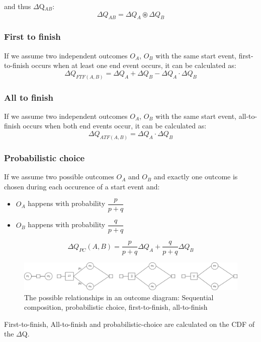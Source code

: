             and thus $\Delta$Q$_{AB}$:
        \begin{equation}
            \Delta Q_{AB} = \Delta Q_A \circledast \Delta Q_B
            \label{eq:}
        \end{equation}
        
    \subsubsection{First to finish}
            If we assume two independent outcomes $O_A$, $O_B$ with the same start event, first-to-finish occurs when at least one end event occurs, it can be calculated as:
        \begin{equation}
            \Delta Q_{FTF(A, B)} = \Delta Q_A + \Delta Q_B - \Delta Q_A \cdot \Delta Q_B  
            \label{eq:ftf}
        \end{equation}
            
    \subsubsection{All to finish}
        If we assume two independent outcomes $O_A$, $O_B$ with the same start event, all-to-finish occurs when both end events occur, it can be calculated as:
        \begin{equation}
            \Delta Q_{ATF(A, B)} = \Delta Q_A \cdot \Delta Q_B 
            \label{eq:atf}
        \end{equation}
        \subsubsection{Probabilistic choice}
        If we assume two possible outcomes $O_A$ and $O_B$ and exactly one outcome is chosen during each occurence of a start event and:
        \begin{itemize}
            \item $O_A$ happens with probability $\dfrac{p}{p+q}$
            \item $O_B$ happens with probability $\dfrac{q}{p + q}$
        \end{itemize}
        \begin{equation}
           \Delta Q_{PC}(A, B) = \dfrac{p}{p + q}\Delta Q_A + \dfrac{q}{p + q}\Delta Q_B 
            \label{eq:pc}
        \end{equation} 

    \begin{figure}[H]
        \begin{center}
            \includegraphics[width = \textwidth]{tikz/op.pdf}
        \end{center}
        \caption{The possible relationships in an outcome diagram: Sequential composition, probabilistic choice, first-to-finish, all-to-finish}
    \end{figure}
    First-to-finish, All-to-finish and probabilistic-choice are calculated on the CDF of the $\Delta$Q.
